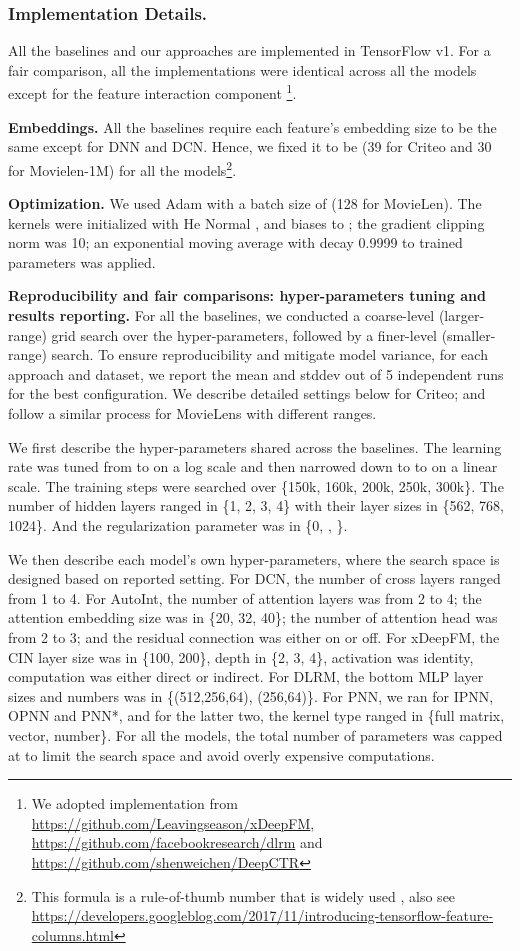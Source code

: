 \documentclass[sigconf]{acmart}
\begin{document}
\subsubsection{Implementation Details.}
\label{sec:implementation_details}
All the baselines and our approaches are implemented in TensorFlow v1. For a fair comparison, all the implementations were identical across all the models except for the feature interaction component \footnote{We adopted implementation from \url{https://github.com/Leavingseason/xDeepFM}, \url{https://github.com/facebookresearch/dlrm} and \url{https://github.com/shenweichen/DeepCTR}}.

{\bf Embeddings.} All the baselines require each feature's embedding size to be the same except for DNN and DCN. Hence, we fixed it to be  (39 for Criteo and 30 for Movielen-1M) for all the models\footnote{This formula is a rule-of-thumb number that is widely used \cite{wang2017deep}, also see \url{https://developers.googleblog.com/2017/11/introducing-tensorflow-feature-columns.html}}. 

{\bf Optimization.} We used Adam \cite{kingma2014adam} with a batch size of  (128 for MovieLen). The kernels were initialized with He Normal \cite{he2015delving}, and biases to ; the gradient clipping norm was 10; an exponential moving average with decay 0.9999 to trained parameters was applied.

{\bf Reproducibility and fair comparisons: hyper-parameters tuning and results reporting.} For all the baselines, we conducted a coarse-level (larger-range) grid search over the hyper-parameters, followed by a finer-level (smaller-range) search. To ensure reproducibility and mitigate model variance, for each approach and dataset, we report the mean and stddev out of 5 independent runs for the best configuration. We describe detailed settings below for Criteo; and follow a similar process for MovieLens with different ranges.

We first describe the hyper-parameters shared across the baselines. The learning rate was tuned from  to  on a log scale and then narrowed down to  to  on a linear scale. The training steps were searched over \{150k, 160k, 200k, 250k, 300k\}. The number of hidden layers ranged in \{1, 2, 3, 4\} with their layer sizes in \{562, 768, 1024\}. And the regularization parameter  was in \{0, , \}.

We then describe each model's own hyper-parameters, where the search space is designed based on reported setting. For DCN, the number of cross layers ranged from 1 to 4. For AutoInt, the number of attention layers was from 2 to 4; the attention embedding size was in \{20, 32, 40\}; the number of attention head was from 2 to 3; and the residual connection was either on or off. For xDeepFM, the CIN layer size was in \{100, 200\}, depth in \{2, 3, 4\}, activation was identity, computation was either direct or indirect. For DLRM, the bottom MLP layer sizes and numbers was in \{(512,256,64), (256,64)\}. For PNN, we ran for IPNN, OPNN and PNN*, and for the latter two, the kernel type ranged in \{full matrix, vector, number\}.
For all the models, the total number of parameters was capped at  to limit the search space and avoid overly expensive computations.
\end{document}
